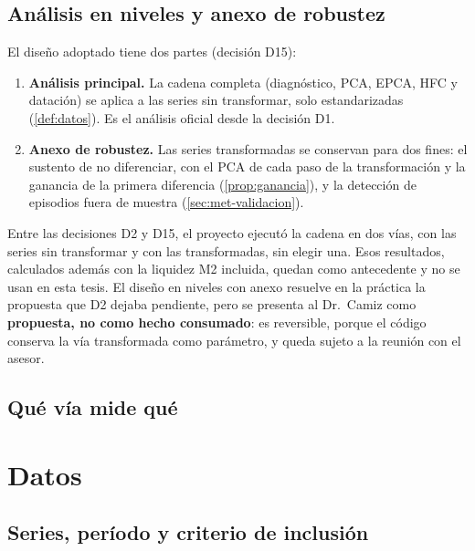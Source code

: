 \subsection{Análisis en niveles y anexo de robustez}

El diseño adoptado tiene dos partes (decisión D15):

\begin{enumerate}[label=(\alph*)]
  \item \textbf{Análisis principal.} La cadena completa (diagnóstico, PCA, EPCA, HFC y datación) se
    aplica a las series sin transformar, solo estandarizadas (\cref{def:datos}). Es el análisis
    oficial desde la decisión D1.
  \item \textbf{Anexo de robustez.} Las series transformadas se conservan para dos fines: el
    sustento de no diferenciar, con el PCA de cada paso de la transformación y la ganancia de la
    primera diferencia (\cref{prop:ganancia}), y la detección de episodios fuera de muestra
    (\cref{sec:met-validacion}).
\end{enumerate}

Entre las decisiones D2 y D15, el proyecto ejecutó la cadena en dos vías, con las series sin
transformar y con las transformadas, sin elegir una. Esos resultados, calculados además con la
liquidez M2 incluida, quedan como antecedente y no se usan en esta tesis. El diseño en niveles con anexo
resuelve en la práctica la propuesta que D2 dejaba pendiente, pero se presenta al Dr.~Camiz
como \textbf{propuesta, no como hecho consumado}: es reversible, porque el código conserva la
vía transformada como parámetro, y queda sujeto a la reunión con el asesor.

\subsection{Qué vía mide qué}
\label{sec:met-vias}


\section{Datos}
\label{sec:met-datos}

\subsection{Series, período y criterio de inclusión}

